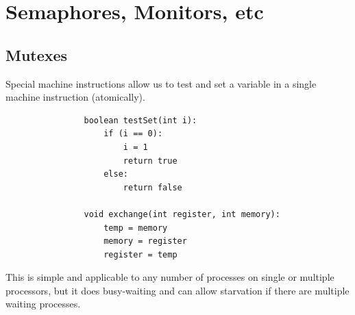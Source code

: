     \section{Semaphores, Monitors, etc} %
    \label{sec:semaphores_monitors_etc}
        \subsection{Mutexes} %
        \label{subsec:mutexes}
            Special machine instructions allow us to test and set a variable in
            a single machine instruction (atomically).

            \begin{verbatim}
                boolean testSet(int i):
                    if (i == 0):
                        i = 1
                        return true
                    else:
                        return false

                void exchange(int register, int memory):
                    temp = memory
                    memory = register
                    register = temp
            \end{verbatim}

            This is simple and applicable to any number of processes on single
            or multiple processors, but it does busy-waiting and can allow
            starvation if there are multiple waiting processes.
